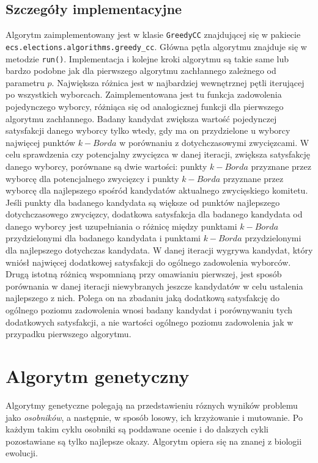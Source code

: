 \documentclass[pdflatex,11pt]{../aghdoc_version2}
\newcommand{\code}[1]{\texttt{#1}}
\begin{document}
\subsection{Szczegóły implementacyjne}
Algorytm zaimplementowany jest w klasie \code{GreedyCC} znajdującej się w pakiecie
\code{ecs.elections.algorithms.greedy\_cc}. Główna pętla algorytmu znajduje się w metodzie \code{run()}.
Implementacja i kolejne kroki algorytmu są takie same lub bardzo podobne jak dla
pierwszego algorytmu zachłannego zależnego od parametru $p$. Największa różnica jest w najbardziej wewnętrznej pętli
iterującej po wszystkich wyborcach. Zaimplementowana jest tu funkcja zadowolenia
pojedynczego wyborcy, różniąca się od analogicznej funkcji dla pierwszego algorytmu
zachłannego. Badany kandydat zwiększa wartość pojedynczej satysfakcji danego wyborcy
tylko wtedy, gdy ma on przydzielone u wyborcy najwięcej punktów $k-Borda$ w porównaniu z
dotychczasowymi zwycięzcami. W celu sprawdzenia czy potencjalny zwycięzca w danej
iteracji, zwiększa satysfakcję danego wyborcy, porównane są dwie wartości: punkty $k-Borda$
przyznane przez wyborcę dla potencjalnego zwycięzcy i punkty $k-Borda$ przyznane przez
wyborcę dla najlepszego spośród kandydatów aktualnego zwycięskiego komitetu. Jeśli
punkty dla badanego kandydata są większe od punktów najlepszego dotychczasowego
zwycięzcy, dodatkowa satysfakcja dla badanego kandydata od danego wyborcy jest
uzupełniania o różnicę między punktami $k-Borda$ przydzielonymi dla badanego kandydata i
punktami $k-Borda$ przydzielonymi dla najlepszego dotychczas kandydata. W danej iteracji
wygrywa kandydat, który wniósł najwięcej dodatkowej satysfakcji do ogólnego zadowolenia
wyborców. Drugą istotną różnicą wspomnianą przy omawianiu pierwszej, jest sposób
porównania w danej iteracji niewybranych jeszcze kandydatów w celu ustalenia najlepszego
z nich. Polega on na zbadaniu jaką dodatkową satysfakcję do ogólnego poziomu
zadowolenia wnosi badany kandydat i porównywaniu tych dodatkowych satysfakcji, a nie
wartości ogólnego poziomu zadowolenia jak w przypadku pierwszego algorytmu.

\section{Algorytm genetyczny}
Algorytmy genetyczne polegają na przedstawieniu róznych wyników problemu 
jako \textit{osobników}, a następnie, w sposób losowy, ich krzyżowanie i mutowanie. 
Po każdym takim cyklu osobniki są poddawane ocenie i do dalszych cykli pozostawiane są tylko
najlepsze okazy. Algorytm opiera się na znanej z biologii ewolucji.
\end{document}
